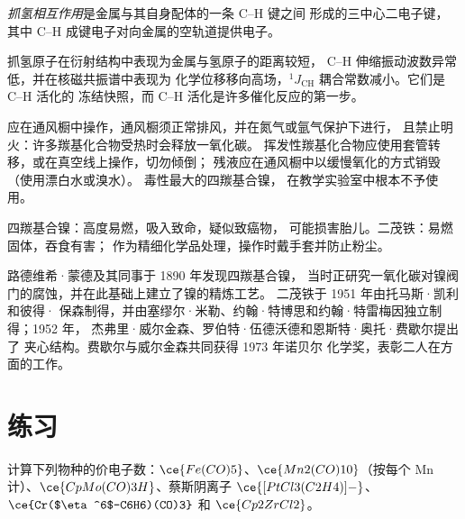 \begin{definition}[抓氢相互作用]\label{def:b3:organometallic-bonding:agostic}
\emph{抓氢相互作用}是金属与其自身配体的一条 C--H 键之间
形成的三中心二电子键，
其中 C--H 成键电子对向金属的空轨道提供电子。
\end{definition}

抓氢原子在衍射结构中表现为金属与氢原子的距离较短，
C--H 伸缩振动波数异常低，并在核磁共振谱中表现为
化学位移移向高场，$^1J_{\mathrm{CH}}$ 耦合常数减小。它们是 C--H 活化的
冻结快照，而 C--H 活化是许多催化反应的第一步。

\begin{inthelab}[金属羰基化合物的操作]
应在通风橱中操作，通风橱须正常排风，并在氮气或氩气保护下进行，
且禁止明火：许多羰基化合物受热时会释放一氧化碳。
挥发性羰基化合物应使用套管转移，或在真空线上操作，切勿倾倒；
残液应在通风橱中以缓慢氧化的方式销毁（使用漂白水或溴水）。
毒性最大的四羰基合镍，
在教学实验室中根本不予使用。
\end{inthelab}

\begin{safety}{}
四羰基合镍：高度易燃，吸入致命，疑似致癌物，
可能损害胎儿。二茂铁：易燃固体，吞食有害；
作为精细化学品处理，操作时戴手套并防止粉尘。
\end{safety}

\begin{history}[蒙德的羰基化合物与夹心结构]
路德维希·蒙德及其同事于 1890 年发现四羰基合镍，
当时正研究一氧化碳对镍阀门的腐蚀，并在此基础上建立了镍的精炼工艺。
二茂铁于 1951 年由托马斯·凯利和彼得·
保森制得，并由塞缪尔·米勒、约翰·特博思和约翰·特雷梅因独立制得；1952 年，
杰弗里·威尔金森、罗伯特·伍德沃德和恩斯特·奥托·费歇尔提出了
夹心结构。费歇尔与威尔金森共同获得 1973 年诺贝尔
化学奖，表彰二人在方面的工作。
\end{history}

\section{练习}

\begin{exercise}[$\star$]\label{exo:b3:organometallic-bonding:1}
计算下列物种的价电子数：$\ce{Fe(CO)5}$、$\ce{Mn2(CO)10}$（按每个 Mn 计）、$\ce{CpMo(CO)3H}$、蔡斯阴离子
$\ce{[PtCl3(C2H4)]-}$、$\ce{Cr($\eta^6$-C6H6)(CO)3}$ 和 $\ce{Cp2ZrCl2}$。
\end{exercise}

